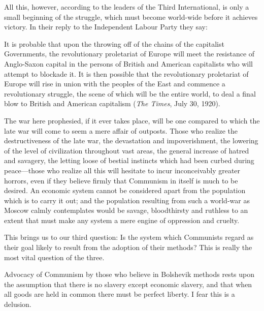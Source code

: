 All this, however, according to the leaders of the Third International, is only a small beginning of the struggle, which must become world-wide before it achieves victory. In their reply to the Independent Labour Party they say:
\begin{displayquote}
It is probable that upon the throwing off of the chains of the capitalist Governments, the revolutionary proletariat of Europe will meet the resistance of Anglo-Saxon capital in the persons of British and American capitalists who will attempt to blockade it. It is then possible that the revolutionary proletariat of Europe will rise in union with the peoples of the East and commence a revolutionary struggle, the scene of which will be the entire world, to deal a final blow to British and American capitalism (\emph{The Times}, July 30, 1920).
\end{displayquote}
The war here prophesied, if it ever takes place, will be one compared to which the late war will come to seem a mere affair of outposts. Those who realize the destructiveness of the late war, the devastation and impoverishment, the lowering of the level of civilization throughout vast areas, the general increase of hatred and savagery, the letting loose of bestial instincts which had been curbed during peace---those who realize all this will hesitate to incur inconceivably greater horrors, even if they believe firmly that Communism in itself is much to be desired. An economic system cannot be considered apart from the population which is to carry it out; and the population resulting from such a world-war as Moscow calmly contemplates would be savage, bloodthirsty and ruthless to an extent that must make any system a mere engine of oppression and cruelty.

This brings us to our third question: Is the system which Communists regard as their goal likely to result from the adoption of their methods? This is really the most vital question of the three.

Advocacy of Communism by those who believe in Bolshevik methods rests upon the assumption that there is no slavery except economic slavery, and that when all goods are held in common there must be perfect liberty. I fear this is a delusion.

